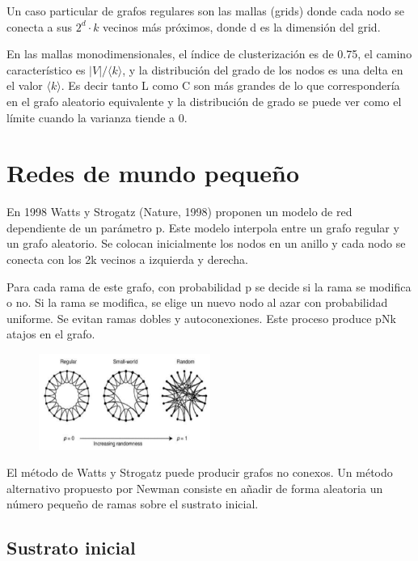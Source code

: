 Un caso particular de grafos regulares son las mallas (grids) donde cada nodo se conecta a sus $2^d \cdot k$ vecinos más próximos, donde d es la dimensión del grid.

En las mallas monodimensionales, el índice de clusterización es de 0.75, el camino característico es $|V|/\langle k \rangle$, y la distribución del grado de los nodos es una delta en el valor $\langle k \rangle$. Es decir tanto L como C son más grandes de lo que correspondería en el grafo aleatorio equivalente y la distribución de grado se puede ver como el límite cuando la varianza tiende a 0.

\section{Redes de mundo pequeño}
En 1998 Watts y Strogatz (Nature, 1998) proponen un modelo de red dependiente de un parámetro p. Este modelo interpola entre un grafo regular y un grafo aleatorio. Se colocan inicialmente los nodos en un anillo y cada nodo se conecta con los 2k vecinos a izquierda y derecha.

Para cada rama de este grafo, con probabilidad p se decide si la rama se modifica o no.
Si la rama se modifica, se elige un nuevo nodo al azar con probabilidad uniforme. Se evitan ramas dobles y
autoconexiones. Este proceso produce pNk atajos en el grafo.

\begin{figure}[h]
\centering
\includegraphics[width = 0.5\textwidth]{figs/grafos.png}
\end{figure}

El método de Watts y Strogatz puede producir grafos no conexos. Un método alternativo propuesto por Newman consiste en añadir de forma aleatoria un número pequeño de ramas sobre el sustrato inicial.

\subsection{Sustrato inicial}
